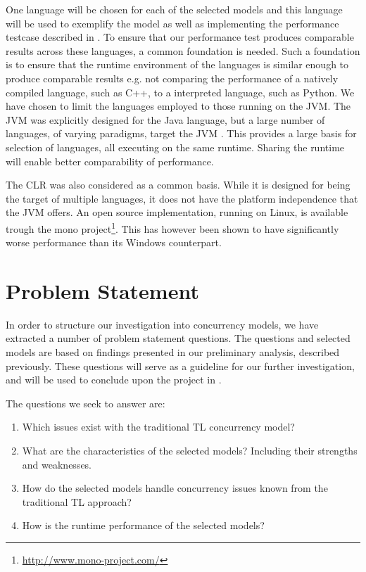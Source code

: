 One language will be chosen for each of the selected models and this language will be used to exemplify the model as well as implementing the performance testcase described in . To ensure that our performance test produces comparable results across these languages, a common foundation is needed. Such a foundation is to ensure that the runtime environment of the languages is similar enough to produce comparable results e.g. not comparing the performance of a natively compiled language, such as C++, to a interpreted language, such as Python. We have chosen to limit the languages employed to those running on the \ac{JVM}. The \ac{JVM} was explicitly designed for the Java language, but a large number of languages, of varying paradigms, target the \ac{JVM} \cite[p. 1]{singer2003jvm}. This provides a large basis for selection of languages, all executing on the same runtime. Sharing the runtime will enable better comparability of performance. 

The \ac{CLR} was also considered as a common basis. While it is designed for being the target of multiple languages, it does not have the platform independence that the \ac{JVM} offers. An open source implementation, running on Linux, is available trough the mono project\footnote{\url{http://www.mono-project.com/}}. This has however been shown to have significantly worse performance than its Windows counterpart\cite[p. 59]{totoo2012haskell}.

\section{Problem Statement}\label{sec:problemstatement}
In order to structure our investigation into concurrency models, we have extracted a number of problem statement questions. The questions and selected models are based on findings presented in our preliminary analysis, described previously. These questions will serve as a guideline for our further investigation, and will be used to conclude upon the project in .

The questions we seek to answer are:
\begin{enumerate}
\item Which issues exist with the traditional \ac{TL} concurrency model?
\item What are the characteristics of the selected models? Including their strengths and weaknesses.
\item How do the selected models handle concurrency issues known from the traditional \ac{TL} approach?
\item How is the runtime performance of the selected models?
\end{enumerate}

